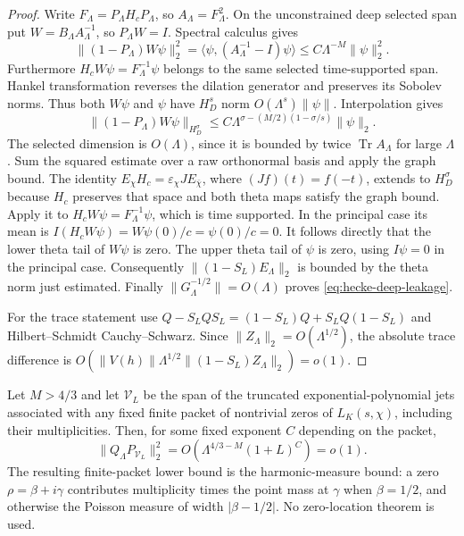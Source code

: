 \begin{proof}
Write $F_\Lambda=P_\Lambda H_cP_\Lambda$, so $A_\Lambda=F_\Lambda^2$.
On the unconstrained deep selected span put
$W=B_\Lambda A_\Lambda^{-1}$, so $P_\Lambda W=I$.  Spectral calculus
gives
\[
 \|(1-P_\Lambda)W\psi\|_2^2
 =\langle\psi,(A_\Lambda^{-1}-I)\psi\rangle
 \leq C\Lambda^{-M}\|\psi\|_2^2.
\]
Furthermore $H_cW\psi=F_\Lambda^{-1}\psi$ belongs to the same
selected time-supported span.  Hankel transformation reverses the
dilation generator and preserves its Sobolev norms.  Thus both
$W\psi$ and $\psi$ have $H_D^s$ norm $O(\Lambda^s)\|\psi\|$.
Interpolation gives
\[
 \|(1-P_\Lambda)W\psi\|_{H_D^\sigma}
 \leq C\Lambda^{\sigma-(M/2)(1-\sigma/s)}\|\psi\|_2.
\]
The selected dimension is $O(\Lambda)$, since it is bounded by
twice $\operatorname{Tr}A_\Lambda$ for large $\Lambda$.  Sum the
squared estimate over a raw orthonormal basis and apply the graph
bound.  The identity $E_\chi H_c=\varepsilon_\chi J E_{\bar\chi}$,
where $(Jf)(t)=f(-t)$, extends to $H_D^\sigma$ because $H_c$
preserves that space and both theta maps satisfy the graph bound.
Apply it to $H_cW\psi=F_\Lambda^{-1}\psi$, which is time supported.
In the principal case its mean is
$I(H_cW\psi)=W\psi(0)/c=\psi(0)/c=0$.
It follows directly that the lower theta tail of $W\psi$ is zero.
The upper theta tail of $\psi$ is zero,
using $I\psi=0$ in the principal case.  Consequently
$\|(1-S_L)E_\Lambda\|_2$ is bounded by the theta norm just estimated.
Finally $\|G_\Lambda^{-1/2}\|=O(\Lambda)$ proves
\eqref{eq:hecke-deep-leakage}.

For the trace statement use
$Q-S_LQS_L=(1-S_L)Q+S_LQ(1-S_L)$ and Hilbert--Schmidt
Cauchy--Schwarz.  Since $\|Z_\Lambda\|_2=O(\Lambda^{1/2})$,
the absolute trace difference is
$O(\|V(h)\|\Lambda^{1/2}\|(1-S_L)Z_\Lambda\|_2)=o(1)$.
\end{proof}

\begin{proposition}
\label{prop:hecke-deep-zero-jets}
Let $M>4/3$ and let $\mathcal V_L$ be the span of the truncated
exponential-polynomial jets associated with any fixed finite packet
of nontrivial zeros of $L_K(s,\chi)$, including their multiplicities.
Then, for some fixed exponent $C$ depending on the packet,
\[
 \|Q_\Lambda P_{\mathcal V_L}\|_2^2
                       =O(\Lambda^{4/3-M}(1+L)^C)=o(1).
\]
The resulting finite-packet lower bound is the harmonic-measure
bound: a zero $\rho=\beta+i\gamma$ contributes multiplicity times
the point mass at $\gamma$ when $\beta=1/2$, and otherwise the
Poisson measure of width $|\beta-1/2|$.  No zero-location theorem
is used.
\end{proposition}

